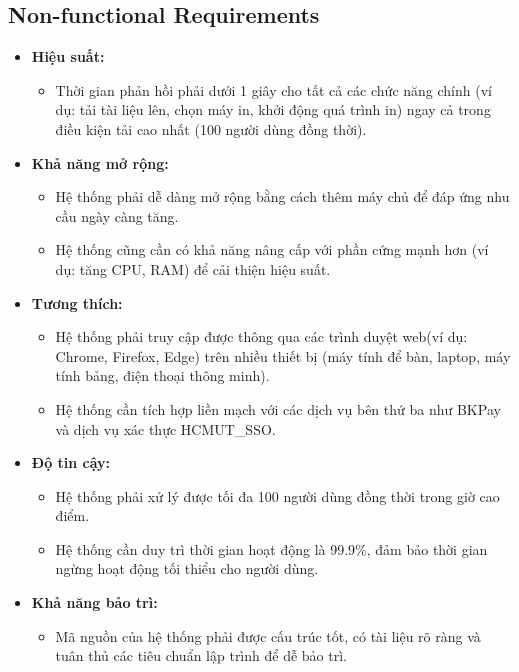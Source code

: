 \subsection{Non-functional Requirements}
\begin{itemize}
	\item \textbf{Hiệu suất:}
	      \begin{itemize}
		      \item Thời gian phản hồi phải dưới 1 giây cho tất cả các chức năng chính (ví dụ: tải tài liệu lên, chọn máy in, khởi động quá trình in) ngay cả trong điều kiện tải cao nhất (100 người dùng đồng thời).
	      \end{itemize}
	\item \textbf{Khả năng mở rộng:}
	      \begin{itemize}
		      \item Hệ thống phải dễ dàng mở rộng bằng cách thêm máy chủ để đáp ứng nhu cầu ngày càng tăng.
		      \item Hệ thống cũng cần có khả năng nâng cấp với phần cứng mạnh hơn (ví dụ: tăng CPU, RAM) để cải thiện hiệu suất.
	      \end{itemize}
	\item \textbf{Tương thích:}
	      \begin{itemize}
		      \item Hệ thống phải truy cập được thông qua các trình duyệt web(ví dụ: Chrome, Firefox, Edge) trên nhiều thiết bị (máy tính để bàn, laptop, máy tính bảng, điện thoại thông minh).
		      \item Hệ thống cần tích hợp liền mạch với các dịch vụ bên thứ ba như BKPay và dịch vụ xác thực HCMUT\_SSO.
	      \end{itemize}
	\item \textbf{Độ tin cậy:}
	      \begin{itemize}
		      \item Hệ thống phải xử lý được tối đa 100 người dùng đồng thời trong giờ cao điểm.
		      \item Hệ thống cần duy trì thời gian hoạt động là 99.9\%, đảm bảo thời gian ngừng hoạt động tối thiểu cho người dùng.
	      \end{itemize}
	\item \textbf{Khả năng bảo trì:}
	      \begin{itemize}
		      \item Mã nguồn của hệ thống phải được cấu trúc tốt, có tài liệu rõ ràng và tuân thủ các tiêu chuẩn lập trình để dễ bảo trì.
	      \end{itemize}

\end{itemize}
